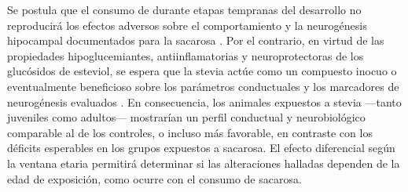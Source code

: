 Se postula que el consumo de \stevia{} durante etapas tempranas del desarrollo no reproducirá los efectos adversos sobre el comportamiento y la neurogénesis hipocampal documentados para la sacarosa \cite{reichelt2016sucrose,coirini2022sucrose}. Por el contrario, en virtud de las propiedades hipoglucemiantes, antiinflamatorias y neuroprotectoras de los glucósidos de esteviol, se espera que la stevia actúe como un compuesto inocuo o eventualmente beneficioso sobre los parámetros conductuales y los marcadores de neurogénesis evaluados \cite{chatsudthipong2009stevioside,pozdnyakova2025stevia,prata2017glycosides}. En consecuencia, los animales expuestos a stevia ---tanto juveniles como adultos--- mostrarían un perfil conductual y neurobiológico comparable al de los controles, o incluso más favorable, en contraste con los déficits esperables en los grupos expuestos a sacarosa. El efecto diferencial según la ventana etaria permitirá determinar si las alteraciones halladas dependen de la edad de exposición, como ocurre con el consumo de sacarosa.
